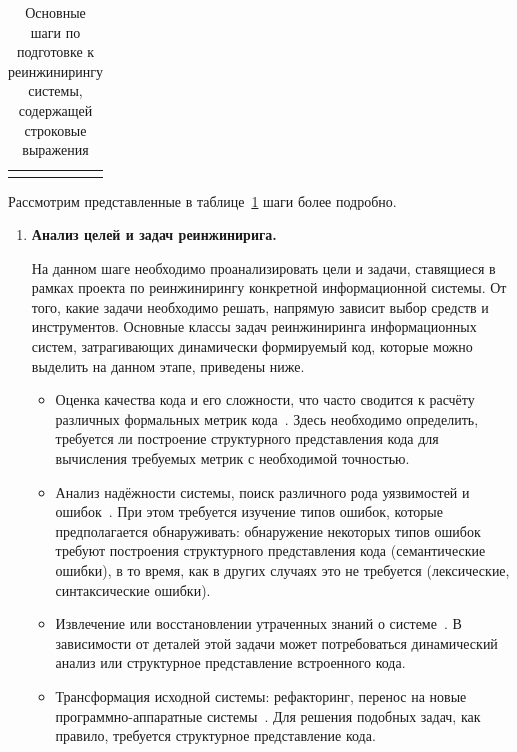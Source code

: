 {\begin{longtable}{| r | p{3cm} | p{3cm} | p{3cm} | p{6cm} |}
  \hline
  \hline
  \caption{Основные шаги по подготовке к реинжинирингу системы, содержащей строковые выражения}\label{tbl:method}
  \end{longtable}
}

Рассмотрим представленные в таблице~\ref{tbl:method} шаги более подробно.

\begin{enumerate}
  \item \textbf{Анализ целей и задач реинжинирига.}
  
  На данном шаге необходимо проанализировать цели и задачи, ставящиеся в рамках проекта по реинжинирингу конкретной информационной системы. От того, какие задачи необходимо решать, напрямую зависит выбор средств и инструментов. Основные классы задач реинжиниринга информационных систем, затрагивающих динамически формируемый код, которые можно выделить на данном этапе, приведены ниже.
  
  \begin{itemize}
    \item Оценка качества кода и его сложности, что часто сводится к расчёту различных формальных метрик кода~\cite{SoftwareMetrics, DSQLQualityMesureBIG}. Здесь необходимо определить, требуется ли построение структурного представления кода для вычисления требуемых метрик с необходимой точностью.
    \item Анализ надёжности системы, поиск различного рода уязвимостей и ошибок~\cite{qualityReeng, reengErrors}. При этом требуется изучение типов ошибок, которые предполагается обнаруживать: обнаружение некоторых типов ошибок требуют построения структурного представления кода (семантические ошибки), в то время, как в других случаях это не требуется (лексические, синтаксические ошибки).
    \item Извлечение или восстановлении утраченных знаний о системе~\cite{reengANT, qualityReeng}. В зависимости от деталей этой задачи может потребоваться динамический анализ или структурное представление встроенного кода.
    \item Трансформация исходной системы: рефакторинг, перенос на новые программно-аппаратные системы~\cite{reengANT, qualityReeng}. Для решения подобных задач, как правило, требуется структурное представление кода.
  \end{itemize}
  

\end{enumerate}
